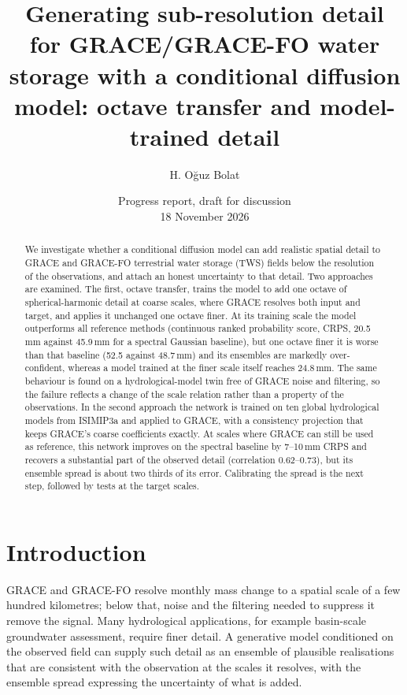\documentclass[11pt,a4paper]{article}
\title{Generating sub-resolution detail for GRACE/GRACE-FO water storage with a conditional
  diffusion model: octave transfer and model-trained detail}
\author{H. Oğuz Bolat}
\date{Progress report, draft for discussion\\[2pt] 18 November 2026}
\begin{document}
\maketitle

\begin{abstract}
\noindent
We investigate whether a conditional diffusion model can add realistic spatial detail to
GRACE and GRACE-FO terrestrial water storage (TWS) fields below the resolution of the
observations, and attach an honest uncertainty to that detail. Two approaches are examined. The
first, octave transfer, trains the model to add one octave of spherical-harmonic detail at
coarse scales, where GRACE resolves both input and target, and applies it unchanged one octave
finer. At its training scale the model outperforms all reference methods (continuous ranked
probability score, CRPS, 20.5\,mm against 45.9\,mm for a spectral Gaussian baseline), but one
octave finer it is worse than that baseline (52.5 against 48.7\,mm) and its ensembles are
markedly over-confident, whereas a model trained at the finer scale itself
reaches 24.8\,mm. The same behaviour is found on a hydrological-model twin free of GRACE noise
and filtering, so the failure reflects a change of the scale relation rather than a property
of the observations. In the second approach the network is trained on ten global hydrological
models from ISIMIP3a and applied to GRACE, with a consistency projection that keeps GRACE's
coarse coefficients exactly. At scales where GRACE can still be used as reference, this
network improves on the spectral baseline by 7--10\,mm CRPS and recovers a substantial part of
the observed detail (correlation 0.62--0.73), but its ensemble spread is about two thirds of
its error. Calibrating the spread is the next step, followed by tests at the target scales.
\end{abstract}

\section{Introduction}

GRACE and GRACE-FO resolve monthly mass change to a spatial scale of a few hundred
kilometres; below that, noise and the filtering needed to suppress it remove the signal. Many
hydrological applications, for example basin-scale groundwater assessment, require finer
detail. A generative model conditioned on the observed field can supply such detail as an
ensemble of plausible realisations that are consistent with the observation at the scales it
resolves, with the ensemble spread expressing the uncertainty of what is added.
\end{document}
